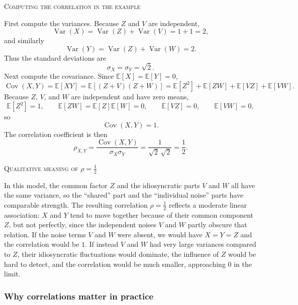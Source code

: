 \bigskip
\textsc{Computing the correlation in the example}

First compute the variances.  
Because \(Z\) and \(V\) are independent,
\[
\operatorname{Var}(X)
=
\operatorname{Var}(Z) + \operatorname{Var}(V)
=
1 + 1
=
2,
\]
and similarly
\[
\operatorname{Var}(Y)
=
\operatorname{Var}(Z) + \operatorname{Var}(W)
=
2.
\]
Thus the standard deviations are
\[
\sigma_X = \sigma_Y = \sqrt{2}.
\]
Next compute the covariance.  
Since \(\mathbb{E}[X]=\mathbb{E}[Y]=0\),
\[
\operatorname{Cov}(X,Y)
=
\mathbb{E}[XY]
=
\mathbb{E}[(Z+V)(Z+W)]
=
\mathbb{E}[Z^{2}]
+
\mathbb{E}[ZW]
+
\mathbb{E}[VZ]
+
\mathbb{E}[VW].
\]
Because \(Z\), \(V\), and \(W\) are independent and have zero means,
\[
\mathbb{E}[Z^{2}] = 1,
\qquad
\mathbb{E}[ZW] = \mathbb{E}[Z]\mathbb{E}[W] = 0,
\qquad
\mathbb{E}[VZ] = 0,
\qquad
\mathbb{E}[VW] = 0,
\]
so
\[
\operatorname{Cov}(X,Y) = 1.
\]
The correlation coefficient is then
\[
\rho_{X,Y}
=
\frac{\operatorname{Cov}(X,Y)}{\sigma_X\sigma_Y}
=
\frac{1}{\sqrt{2}\,\sqrt{2}}
=
\frac{1}{2}.
\]

\bigskip
\textsc{Qualitative meaning of \(\rho = \tfrac{1}{2}\)}

In this model, the common factor \(Z\) and the idiosyncratic parts \(V\) and \(W\) all have the same variance, so the “shared” part and the “individual noise” parts have comparable strength.  
The resulting correlation \(\rho=\tfrac{1}{2}\) reflects a moderate linear association: \(X\) and \(Y\) tend to move together because of their common component \(Z\), but not perfectly, since the independent noises \(V\) and \(W\) partly obscure that relation.  
If the noise terms \(V\) and \(W\) were absent, we would have \(X=Y=Z\) and the correlation would be \(1\).  
If instead \(V\) and \(W\) had very large variances compared to \(Z\), their idiosyncratic fluctuations would dominate, the influence of \(Z\) would be hard to detect, and the correlation would be much smaller, approaching \(0\) in the limit.


\subsubsection{Why correlations matter in practice}

